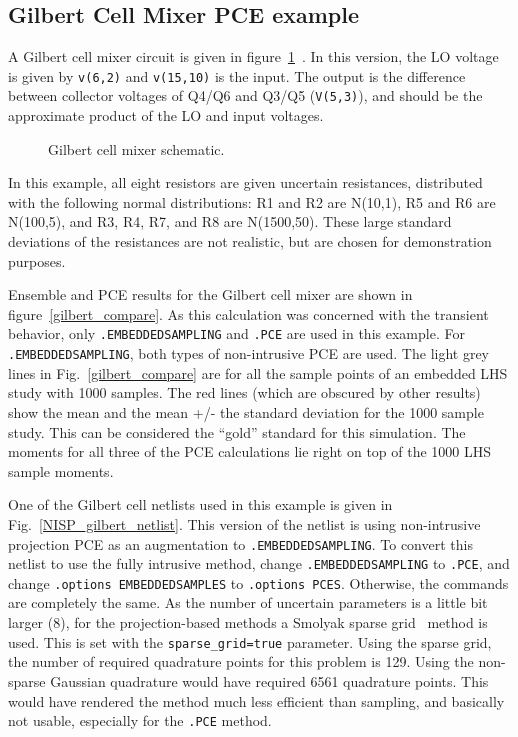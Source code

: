 \subsection{Gilbert Cell Mixer PCE example}
\label{xyceGilbertCell}
A Gilbert cell mixer circuit is given in figure~\ref{gilbert}~\cite{1049925}.
In this version, the LO voltage is given by \texttt{v(6,2)} and \texttt{v(15,10)} is the input. 
The output is the difference between collector voltages of Q4/Q6 and Q3/Q5 (\texttt{V(5,3)}), 
and should be the approximate product of the LO and input voltages.
\begin{figure}[hbt]
\centering
\resizebox{.9\linewidth}{!}{ }
  \caption[Gilbert cell mixer schematic]
  {Gilbert cell mixer schematic.}
\label{gilbert}
\end{figure}
In this example, all eight 
resistors are given uncertain resistances, distributed with the following normal distributions:  R1 and R2 are N(10,1), 
R5 and R6 are N(100,5), and R3, R4, R7, and R8 are N(1500,50).  These large standard deviations of the resistances are 
not realistic, but are chosen for demonstration purposes.

Ensemble and PCE results for the Gilbert cell mixer are shown in figure~\ref{gilbert_compare}.   
As this calculation was concerned with the transient behavior, only \texttt{.EMBEDDEDSAMPLING} 
and \texttt{.PCE} are used in this example.  For \texttt{.EMBEDDEDSAMPLING}, both types of 
non-intrusive PCE are used.
The light grey lines in Fig.~\ref{gilbert_compare} are for all the sample points 
of an embedded LHS study with 1000 samples.    The red lines (which are obscured 
by other results) show the mean and the mean +/- the standard deviation for the 
1000 sample study.  This can be considered the ``gold'' standard for this simulation.
The moments for all three of the \Xyce{} PCE calculations lie right on top of the 
1000 LHS sample moments.  

One of the Gilbert cell netlists used in this example is given in Fig.~\ref{NISP_gilbert_netlist}.  This version of the netlist
is using non-intrusive projection PCE as an augmentation to \texttt{.EMBEDDEDSAMPLING}.  To convert this netlist to 
use the fully intrusive method, change \texttt{.EMBEDDEDSAMPLING} to \texttt{.PCE}, and 
change \texttt{.options EMBEDDEDSAMPLES} to \texttt{.options PCES}.   Otherwise, the commands are completely the same.
As the number of uncertain parameters is a little bit larger (8), for the projection-based methods a 
Smolyak sparse grid~\cite{Smolyak_63} method is used.  This is set with the  \texttt{sparse\_grid=true} parameter. 
Using the sparse grid, the number of 
required quadrature points for this problem is 129.  Using the non-sparse Gaussian quadrature 
would have required 6561 quadrature points. This would have rendered the method much 
less efficient than sampling, and basically not usable, especially for the \texttt{.PCE} method.

